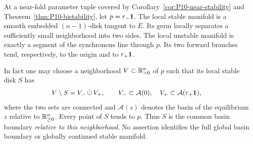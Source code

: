 \begin{proposition}
\label{prop:P10-local-basins}
At a near-fold parameter tuple covered by
Corollary~\ref{cor:P10-near-stability} and
Theorem~\ref{thm:P10-bistability}, let $p=r_-\mathbf{1}$.
The local stable manifold is a smooth embedded $(n-1)$-disk tangent
to $E$. Its germ locally separates a sufficiently small neighborhood
into two sides. The local unstable manifold is exactly a segment of
the synchronous line through $p$. Its two forward branches tend,
respectively, to the origin and to $r_+\mathbf{1}$.

In fact one may choose a neighborhood $V\subset\mathbb{R}_{>0}^{n}$ of $p$
such that its local stable disk $S$ has
\begin{equation}
 V\setminus S=V_-\mathbin{\dot\cup}V_+,\qquad
 V_-\subset\mathcal A(0),\quad V_+\subset\mathcal A(r_+\mathbf{1}),
 \label{eq:P10-local-partition}
\end{equation}
where the two sets are connected and $\mathcal A(z)$ denotes the
basin of the equilibrium $z$ relative to $\mathbb{R}_{\geq 0}^{n}$. Every point of
$S$ tends to $p$. Thus $S$ is the common basin boundary \emph{relative
to this neighborhood}. No assertion identifies the full global basin
boundary or globally continued stable manifold.
\end{proposition}
